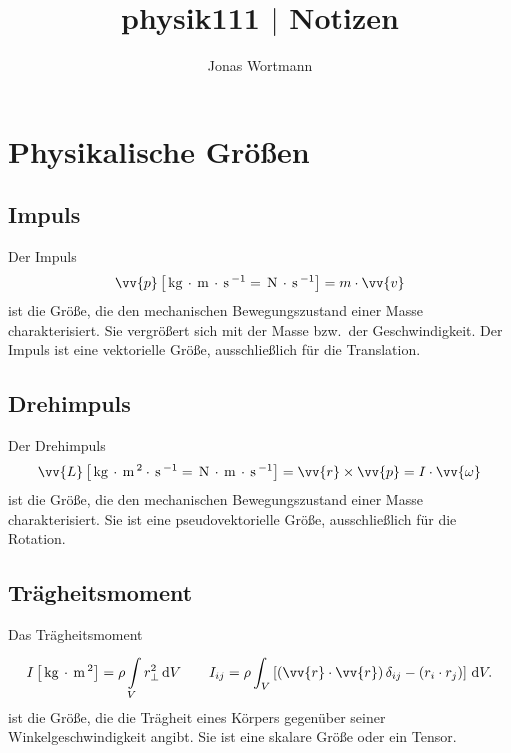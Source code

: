 \documentclass[a4paper,12pt]{article}
\newcommand{\td}{\,\text{d}}
\numberwithin{equation}{section}
\begin{document}

\title{physik111 $|$ Notizen}
\author{Jonas Wortmann}
\maketitle
{}


\newpage


\fancyhead[L]{\thepage}
\fancyfoot[C]{}

\tableofcontents


\newpage



\fancyhead[R]{\leftmark\\\rightmark}

\section{Physikalische Größen}
\subsection{Impuls}
Der Impuls
\[ 
        \vv{p}\left[\,\text{kg}\,\cdot \,\text{m}\, \cdot \,\text{s}\, ^{-1}=\,\text{N}\,\cdot \,\text{s}\, ^{-1}\right]=m\cdot \vv{v} 
\] 
ist die Größe, die den mechanischen Bewegungszustand einer Masse charakterisiert. Sie vergrößert sich mit der Masse bzw.\ der Geschwindigkeit. Der Impuls ist eine vektorielle Größe, ausschließlich für die Translation.

\subsection{Drehimpuls}
Der Drehimpuls
\[ 
        \vv{L}\left[\,\text{kg}\,\cdot \,\text{m}\,^2\cdot \,\text{s}\, ^{-1}=\,\text{N}\,\cdot \,\text{m}\,\cdot \,\text{s}\, ^{-1}\right]=\vv{r}\times \vv{p}=I\cdot \vv{\omega }
\]
ist die Größe, die den mechanischen Bewegungszustand einer Masse charakterisiert. Sie ist eine pseudovektorielle Größe, ausschließlich für die Rotation.

\subsection{Trägheitsmoment}
Das Trägheitsmoment
\[ 
        I\left[\,\text{kg}\,\cdot \,\text{m}\,^2\right]=\rho \int\limits_{V}^{}r_\perp^2\td V\qquad I_{ij}=\rho \int_{V}^{}\left[\left(\vv{r}\cdot \vv{r}\right)\delta _{ij}-\left(r_i\cdot r_j\right)\right]\td V
.\] 
ist die Größe, die die Trägheit eines Körpers gegenüber seiner Winkelgeschwindigkeit angibt. Sie ist eine skalare Größe oder ein Tensor.
\end{document}
